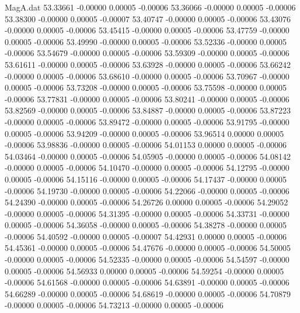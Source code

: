 \begin{filecontents}{MagA.dat}
  53.33661   -0.00000    0.00005   -0.00006
  53.36066   -0.00000    0.00005   -0.00006
  53.38300   -0.00000    0.00005   -0.00007
  53.40747   -0.00000    0.00005   -0.00006
  53.43076   -0.00000    0.00005   -0.00006
  53.45415   -0.00000    0.00005   -0.00006
  53.47759   -0.00000    0.00005   -0.00006
  53.49990   -0.00000    0.00005   -0.00006
  53.52336   -0.00000    0.00005   -0.00006
  53.54679   -0.00000    0.00005   -0.00006
  53.59309   -0.00000    0.00005   -0.00006
  53.61611   -0.00000    0.00005   -0.00006
  53.63928   -0.00000    0.00005   -0.00006
  53.66242   -0.00000    0.00005   -0.00006
  53.68610   -0.00000    0.00005   -0.00006
  53.70967   -0.00000    0.00005   -0.00006
  53.73208   -0.00000    0.00005   -0.00006
  53.75598   -0.00000    0.00005   -0.00006
  53.77831   -0.00000    0.00005   -0.00006
  53.80241   -0.00000    0.00005   -0.00006
  53.82569   -0.00000    0.00005   -0.00006
  53.84887   -0.00000    0.00005   -0.00006
  53.87223   -0.00000    0.00005   -0.00006
  53.89472   -0.00000    0.00005   -0.00006
  53.91795   -0.00000    0.00005   -0.00006
  53.94209   -0.00000    0.00005   -0.00006
  53.96514    0.00000    0.00005   -0.00006
  53.98836   -0.00000    0.00005   -0.00006
  54.01153    0.00000    0.00005   -0.00006
  54.03464   -0.00000    0.00005   -0.00006
  54.05905   -0.00000    0.00005   -0.00006
  54.08142   -0.00000    0.00005   -0.00006
  54.10470   -0.00000    0.00005   -0.00006
  54.12795   -0.00000    0.00005   -0.00006
  54.15116   -0.00000    0.00005   -0.00006
  54.17437   -0.00000    0.00005   -0.00006
  54.19730   -0.00000    0.00005   -0.00006
  54.22066   -0.00000    0.00005   -0.00006
  54.24390   -0.00000    0.00005   -0.00006
  54.26726    0.00000    0.00005   -0.00006
  54.29052   -0.00000    0.00005   -0.00006
  54.31395   -0.00000    0.00005   -0.00006
  54.33731   -0.00000    0.00005   -0.00006
  54.36058   -0.00000    0.00005   -0.00006
  54.38278   -0.00000    0.00005   -0.00006
  54.40592   -0.00000    0.00005   -0.00007
  54.42931    0.00000    0.00005   -0.00006
  54.45361   -0.00000    0.00005   -0.00006
  54.47676   -0.00000    0.00005   -0.00006
  54.50005   -0.00000    0.00005   -0.00006
  54.52335   -0.00000    0.00005   -0.00006
  54.54597   -0.00000    0.00005   -0.00006
  54.56933    0.00000    0.00005   -0.00006
  54.59254   -0.00000    0.00005   -0.00006
  54.61568   -0.00000    0.00005   -0.00006
  54.63891   -0.00000    0.00005   -0.00006
  54.66289   -0.00000    0.00005   -0.00006
  54.68619   -0.00000    0.00005   -0.00006
  54.70879   -0.00000    0.00005   -0.00006
  54.73213   -0.00000    0.00005   -0.00006

\end{filecontents}
